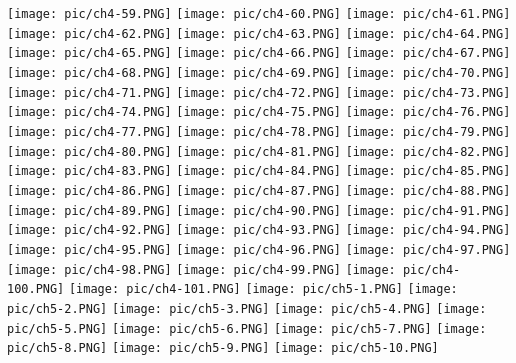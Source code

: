 \documentclass[UTF-8]{ctexart}
\begin{document}
\begin{center}
    \texttt{[image: pic/ch4-59.PNG]}
    \texttt{[image: pic/ch4-60.PNG]}
    \texttt{[image: pic/ch4-61.PNG]}
    \texttt{[image: pic/ch4-62.PNG]}
    \texttt{[image: pic/ch4-63.PNG]}
    \texttt{[image: pic/ch4-64.PNG]}
    \texttt{[image: pic/ch4-65.PNG]}
    \texttt{[image: pic/ch4-66.PNG]}
    \texttt{[image: pic/ch4-67.PNG]}
    \texttt{[image: pic/ch4-68.PNG]}
    \texttt{[image: pic/ch4-69.PNG]}
    \texttt{[image: pic/ch4-70.PNG]}
    \texttt{[image: pic/ch4-71.PNG]}
    \texttt{[image: pic/ch4-72.PNG]}
    \texttt{[image: pic/ch4-73.PNG]}
    \texttt{[image: pic/ch4-74.PNG]}
    \texttt{[image: pic/ch4-75.PNG]}
    \texttt{[image: pic/ch4-76.PNG]}
    \texttt{[image: pic/ch4-77.PNG]}
    \texttt{[image: pic/ch4-78.PNG]}
    \texttt{[image: pic/ch4-79.PNG]}
    \texttt{[image: pic/ch4-80.PNG]}
    \texttt{[image: pic/ch4-81.PNG]}
    \texttt{[image: pic/ch4-82.PNG]}
    \texttt{[image: pic/ch4-83.PNG]}
    \texttt{[image: pic/ch4-84.PNG]}
    \texttt{[image: pic/ch4-85.PNG]}
    \texttt{[image: pic/ch4-86.PNG]}
    \texttt{[image: pic/ch4-87.PNG]}
    \texttt{[image: pic/ch4-88.PNG]}
    \texttt{[image: pic/ch4-89.PNG]}
    \texttt{[image: pic/ch4-90.PNG]}
    \texttt{[image: pic/ch4-91.PNG]}
    \texttt{[image: pic/ch4-92.PNG]}
    \texttt{[image: pic/ch4-93.PNG]}
    \texttt{[image: pic/ch4-94.PNG]}
    \texttt{[image: pic/ch4-95.PNG]}
    \texttt{[image: pic/ch4-96.PNG]}
    \texttt{[image: pic/ch4-97.PNG]}
    \texttt{[image: pic/ch4-98.PNG]}
    \texttt{[image: pic/ch4-99.PNG]}
    \texttt{[image: pic/ch4-100.PNG]}
    \texttt{[image: pic/ch4-101.PNG]}
    \newpage
    \texttt{[image: pic/ch5-1.PNG]}
    \texttt{[image: pic/ch5-2.PNG]}
    \texttt{[image: pic/ch5-3.PNG]}
    \texttt{[image: pic/ch5-4.PNG]}
    \texttt{[image: pic/ch5-5.PNG]}
    \texttt{[image: pic/ch5-6.PNG]}
    \texttt{[image: pic/ch5-7.PNG]}
    \texttt{[image: pic/ch5-8.PNG]}
    \texttt{[image: pic/ch5-9.PNG]}
    \texttt{[image: pic/ch5-10.PNG]}

\end{center}
\end{document}
